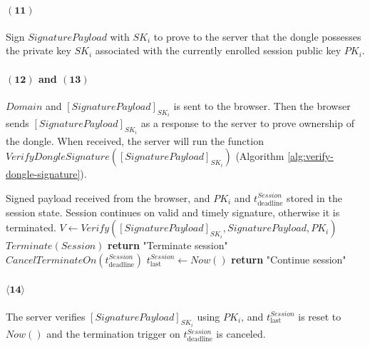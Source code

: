 \paragraph{$\boldsymbol{(11)}$} Sign $SignaturePayload$ with $SK_i$ to prove to the server that the dongle possesses the private key $SK_i$ associated with the currently enrolled session public key $PK_i$.

\paragraph{$\boldsymbol{(12)}$ and $\boldsymbol{(13)}$} $Domain$ and $[SignaturePayload]_{SK_i}$ is sent to the browser. Then the browser sends $[SignaturePayload]_{SK_i}$ as a response to the server to prove ownership of the dongle. When received, the server will run the function $VerifyDongleSignature([SignaturePayload]_{SK_i})$ (Algorithm \ref{alg:verify-dongle-signature}).

\begin{algorithm}[ht!]
\caption{$VerifyDongleSignature([SignaturePayload]_{SK_i})$}
\begin{algorithmic}[1]
    \Require Signed payload received from the browser, and
             $PK_i$ and $t^{Session}_{\text{deadline}}$ stored in the session state.
    \Ensure  Session continues on valid and timely signature, otherwise it is terminated.
    \State $V \leftarrow Verify([SignaturePayload]_{SK_i}, SignaturePayload, PK_i)$
        \State $Terminate(Session)$
        \State \textbf{return} "Terminate session"
    \EndIf
    \State $CancelTerminateOn(t_\text{deadline}^{Session})$
    \State $t^{Session}_{\text{last}} \leftarrow Now()$
    \State \textbf{return} "Continue session"
\end{algorithmic}
\label{alg:verify-dongle-signature}
\end{algorithm}

\paragraph{$\boldsymbol{\langle14\rangle}$} The server verifies $[SignaturePayload]_{SK_i}$ using $PK_i$, and $t^{Session}_\text{last}$ is reset to $Now()$ and the termination trigger on $t_\text{deadline}^{Session}$ is canceled.

